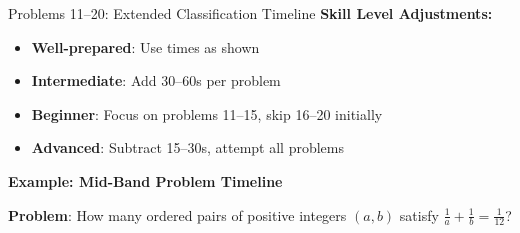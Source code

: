 \documentclass{article}
\begin{document}
\begin{timebox}{Problems 11--20: Extended Classification Timeline}
\textbf{Skill Level Adjustments:}
\begin{itemize}[nosep]
\item \textbf{Well-prepared}: Use times as shown
\item \textbf{Intermediate}: Add 30--60s per problem
\item \textbf{Beginner}: Focus on problems 11--15, skip 16--20 initially
\item \textbf{Advanced}: Subtract 15--30s, attempt all problems
\end{itemize}

\textbf{Example: Mid-Band Problem Timeline}
\begin{tcolorbox}[colback=yellow!5!white,colframe=yellow!50!black]
\textbf{Problem}: How many ordered pairs of positive integers $(a,b)$ satisfy $\frac{1}{a} + \frac{1}{b} = \frac{1}{12}$?


\end{tcolorbox}
\end{timebox}
\end{document}
